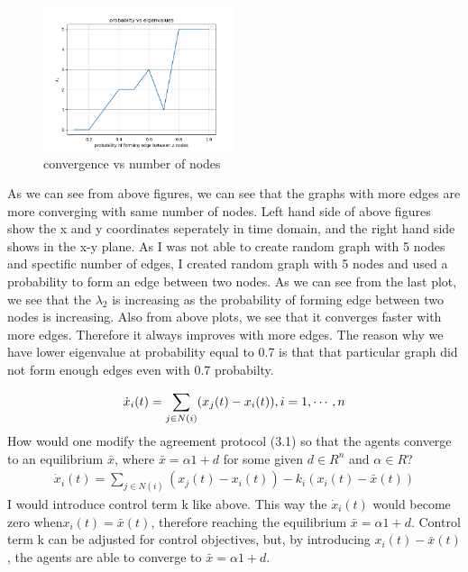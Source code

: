 \documentclass{article}
\begin{document}
\begin{problem}
\begin{figure}
    \end{figure}
    \begin{figure}
        \centering
        \includegraphics[width=0.5\textwidth]{./img/prob_vs_lambda.png}
        \caption{convergence vs number of nodes}
    \end{figure}
    \newpage
    As we can see from above figures, we can see that the graphs with more edges are more converging with same number of nodes. Left hand side of above figures show the x and y coordinates seperately in time domain, and the right hand side shows in the x-y plane. As I was not able to create random graph with 5 nodes and spectific number of edges, I created random graph with 5 nodes and used a probability to form an edge between two nodes. As we can see from the last plot, we see that the $\lambda_2$ is increasing as the probability of forming edge between two nodes is increasing. Also from above plots, we see that it converges faster with more edges. Therefore it always improves with more edges. The reason why we have lower eigenvalue at probability equal to 0.7 is that that particular graph did not form enough edges even with 0.7 probabilty. 
\end{problem}
\newpage
\begin{problem}
    \begin{align*}
        \dot{x}_i(t) = \sum_{j \in N(i)} (x_j(t) - x_i(t)), \space i = 1, \cdots , n
    \end{align*}
    How would one modify the agreement protocol (3.1) so that the agents converge to an equilibrium $\bar{x}$, where $\bar{x} = \alpha 1 + d$ for some given $d \in R^n$ and $\alpha \in R$?
    \begin{align*}
        \dot{x}_i(t) = \sum_{j \in N(i)} (x_j(t) - x_i(t)) - k_i(x_i(t) - \bar{x}(t))
    \end{align*}
    I would introduce control term k like above. This way the $\dot{x}_i(t)$ would become zero when$ x_i(t) = \bar{x}(t)$, therefore reaching the equilibrium $\bar{x} = \alpha 1 + d$.
    Control term k can be adjusted for control objectives, but, by introducing $x_i(t) - \bar{x}(t)$, the agents are able to converge to  $\bar{x} = \alpha 1 + d$.
\end{problem}
\end{document}

